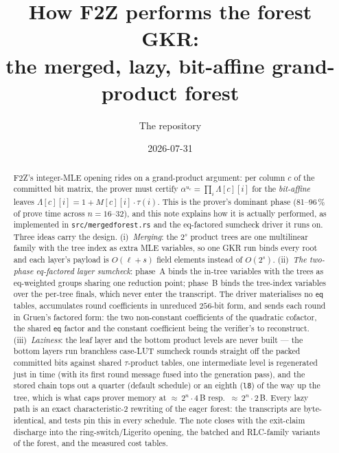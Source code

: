 \documentclass[11pt]{article}
\title{How F2Z performs the forest GKR:\\
  the merged, lazy, bit-affine grand-product forest}
\author{The \code{f2z-pcs} repository}
\date{2026-07-31}
\newcommand{\eq}{\mathsf{eq}}
\newcommand{\code}[1]{{\def\_{\textunderscore\allowbreak}\texttt{#1}}}
\theoremstyle{definition}
\begin{document}
\maketitle

\begin{abstract}
\noindent
F2Z's integer-MLE opening rides on a grand-product argument: per column
$c$ of the committed bit matrix, the prover must certify
$\alpha^{u_c} = \prod_i \Lambda[c][i]$ for the \emph{bit-affine} leaves
$\Lambda[c][i] = 1 + M[c][i]\cdot\tau(i)$.  This is the prover's dominant
phase (81--96\,\% of prove time across $n = 16$--$32$), and this note
explains how it is actually performed, as implemented in
\code{src/merged\_forest.rs} and the eq-factored sumcheck driver it runs
on.  Three ideas carry the design.  (i)~\emph{Merging}: the $2^s$
product trees are one multilinear family with the tree index as extra
MLE variables, so one GKR run binds every root and each layer's payload
is $O(\ell + s)$ field elements instead of $O(2^s)$.  (ii)~\emph{The
two-phase eq-factored layer sumcheck}: phase~A binds the in-tree
variables with the trees as eq-weighted groups sharing one reduction
point; phase~B binds the tree-index variables over the per-tree finals,
which never enter the transcript.  The driver materialises no $\eq$
tables, accumulates round coefficients in unreduced $256$-bit form, and
sends each round in Gruen's factored form: the two non-constant
coefficients of the quadratic cofactor, the shared $\eq$ factor and the
constant coefficient being the verifier's to reconstruct.  (iii)~\emph{Laziness}: the leaf layer and the
bottom product levels are never built --- the bottom layers run
branchless case-LUT sumcheck rounds straight off the packed committed
bits against shared $\tau$-product tables, one intermediate level is
regenerated just in time (with its first round message fused into the
generation pass), and the stored chain tops out a quarter (default
schedule) or an eighth (\code{l8}) of the way up the tree, which is what
caps prover memory at ${\approx}\,2^n{\cdot}4$\,B resp.\
${\approx}\,2^n{\cdot}2$\,B.  Every lazy path is an exact
characteristic-2 rewriting of the eager forest: the transcripts are
byte-identical, and tests pin this in every schedule.  The note closes
with the exit-claim discharge into the ring-switch/Ligerito opening, the
batched and RLC-family variants of the forest, and the measured cost
tables.
\end{abstract}

\tableofcontents

\end{document}
